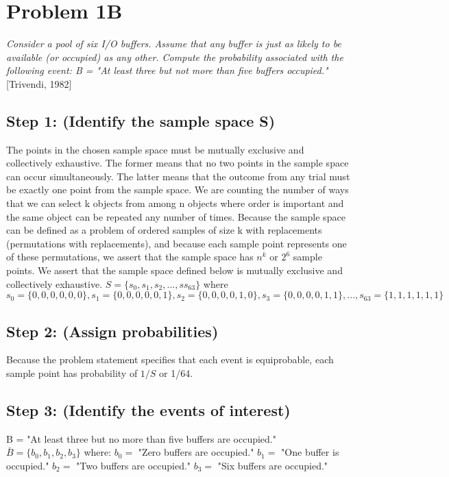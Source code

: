 \documentclass[a4paper,10pt]{article}
\title{}
\author{Mark Johnson \\
Loyola University Chicago}
\date {mjohnson4@luc.edu}
\begin{document}
\maketitle

\section{Problem 1B}
\emph{Consider a pool of six I/O buffers. Assume that any buffer is just as likely to be available (or occupied) as 
any other. Compute the probability associated with the following event: \newline
B = "At least three but not more than five buffers occupied."} [Trivendi, 1982]

\subsection{Step 1: (Identify the sample space S)}
The points in the chosen sample space must be mutually exclusive and collectively exhaustive. The former means that 
no two points in the sample space can occur simultaneously. The latter means that the outcome from any trial must be 
exactly one point from the sample space. We are counting the number of ways that we can select k objects from among n 
objects where order is important and the same object can be repeated any number of times. Because the sample space 
can be defined as a problem of ordered samples of size k with replacements (permutations with replacements), and 
because each sample point represents one of these permutations, we assert that the sample space has $ n^{k} $ or $ 2 
^{6} $ sample points. We assert that the sample space defined below is mutually exclusive and collectively 
exhaustive. \newline
$ S = \{s_{0}, s_{1}, s_{2},...,ss_{63}\} $ where \newline
$ s_{0} = \{0,0,0,0,0,0\}, s_{1} = \{0,0,0,0,0,1\}, s_{2} = \{0,0,0,0,1,0\}, s_{3} = \{0,0,0,0,1,1\},...,s_{63} = 
\{1,1,1,1,1,1\} $

\subsection{Step 2: (Assign probabilities)}
Because the problem statement specifies that each event is equiprobable, each sample point has probability of $ 1/S $ 
or 1/64.

\subsection{Step 3: (Identify the events of interest)}
B = "At least three but no more than five buffers are occupied." \newline
$ \bar{B} = \{b_{0}, b_{1}, b_{2}, b_{3}\} $ where: \newline
$ b_{0} = $ "Zero buffers are occupied." \newline
$ b_{1} = $ "One buffer is occupied." \newline
$ b_{2} = $ "Two buffers are occupied." \newline
$ b_{3} = $ "Six buffers are occupied." \newline \newline
\end{document}
